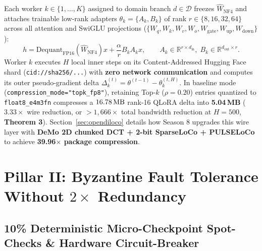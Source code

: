 \documentclass[11pt,a4paper]{article}
\begin{document}
Each worker $k \in \{1, \dots, K\}$ assigned to domain branch $d \in \mathcal{D}$ freezes $\hat{W}_{\text{NF4}}$ and attaches trainable low-rank adapters $\theta_k = \{A_k, B_k\}$ of rank $r \in \{8, 16, 32, 64\}$ across all attention and SwiGLU projections ($\{W_q, W_k, W_v, W_o, W_{\text{gate}}, W_{\text{up}}, W_{\text{down}}\}$):
\begin{equation}
    h = \text{Dequant}_{\text{FP16}}(\hat{W}_{\text{NF4}}) x + \frac{\alpha}{r} B_k A_k x, \qquad A_k \in \mathbb{R}^{r \times d_{\text{in}}}, \; B_k \in \mathbb{R}^{d_{\text{out}} \times r}.
\end{equation}
Worker $k$ executes $H$ local inner steps on its Content-Addressed Hugging Face shard (\texttt{cid://sha256/...}) with \textbf{zero network communication} and computes its outer pseudo-gradient delta $\Delta_k^{(t)} = \theta^{(t-1)} - \theta_k^{(t, H)}$. In baseline mode (\texttt{compression\_mode="topk\_fp8"}), retaining Top-$k$ ($\rho = 0.20$) entries quantized to \texttt{float8\_e4m3fn} compresses a $16.78\text{\,MB}$ rank-16 QLoRA delta into \textbf{5.04\,MB} ($3.33\times$ wire reduction, or $>1,666\times$ total bandwidth reduction at $H=500$, \textbf{Theorem 3}). Section~\ref{sec:opendiloco} details how Season 8 upgrades this wire layer with \textbf{DeMo 2D chunked DCT + 2-bit SparseLoCo + PULSELoCo} to achieve \textbf{39.96$\times$ package compression}.

\section{Pillar II: Byzantine Fault Tolerance Without $2\times$ Redundancy}

\subsection{10\% Deterministic Micro-Checkpoint Spot-Checks \& Hardware Circuit-Breaker}\label{sec:byz_replay_note}
\end{document}

